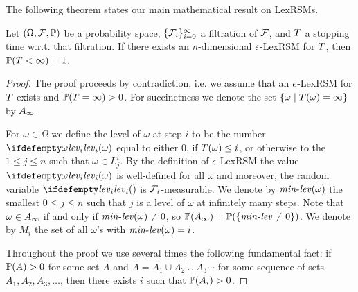 The following theorem states our main mathematical result on LexRSMs.

\begin{theorem}
\label{thm:lexrsm-main}
\label{THM:LEXRSM-MAIN}
Let $(\Omega,\mathcal{F},\mathbb{P})$ be a probability space, 
$\{\mathcal{F}_i\}_{i=0}^{\infty}$ a filtration of $\mathcal{F}$, and $T$ a 
stopping 
time w.r.t. that filtration. If there exists an $n$-dimensional $\epsilon$-LexRSM for $T$, 
then $\mathbb{P}(T<\infty)=1$.
\end{theorem}
\begin{proof}
The proof proceeds by contradiction, i.e. we assume that an $\epsilon$-LexRSM for 
$T$ exists and $\mathbb{P}(T=\infty)>0$. For succinctness we denote the 
set $\{\omega\mid T(\omega)=\infty\}$ by $A_{\infty}$.

For $\omega\in \Omega$ we define the level of $\omega$ at step $i$ to be the 
number $\levelrank{\omega}{i}$ equal to either $0$, if $T(\omega)\leq i$, 
or otherwise to the $1\leq j \leq n$ such that $\omega\in L^i_j$. By the definition of 
$\epsilon$-LexRSM the value $\levelrank{\omega}{i}$ is well-defined for all 
$\omega$ and moreover, the random variable $\levelrank{}{i}$ is $\mathcal{F}_i$-measurable. We denote by $\mathit{min}\text{-}\mathit{lev}(\omega)$ the smallest $0 \leq j \leq n$ such 
that $j$ is a level of $\omega$ at infinitely many steps. Note that $\omega \in 
A_{\infty}$ if and only if $\mathit{min}\text{-}\mathit{lev}(\omega)\neq 0$, so $\mathbb{P}(A_{\infty})=\mathbb{P}(\{\mathit{min}\text{-}\mathit{lev} \neq 0 \})$. We denote by $M_i$ 
the set of all $\omega$'s with $\mathit{min}\text{-}\mathit{lev}(\omega)=i$.

Throughout the proof we use several times the following fundamental fact: if 
$\mathbb{P}(A)>0$ for some set $A$ and $A=A_1\cup A_2 \cup A_3\cdots$ for some 
sequence of sets $A_1,A_2,A_3,\dots$, then there exists $i$ such that 
$\mathbb{P}(A_i)>0$.


\end{proof}
